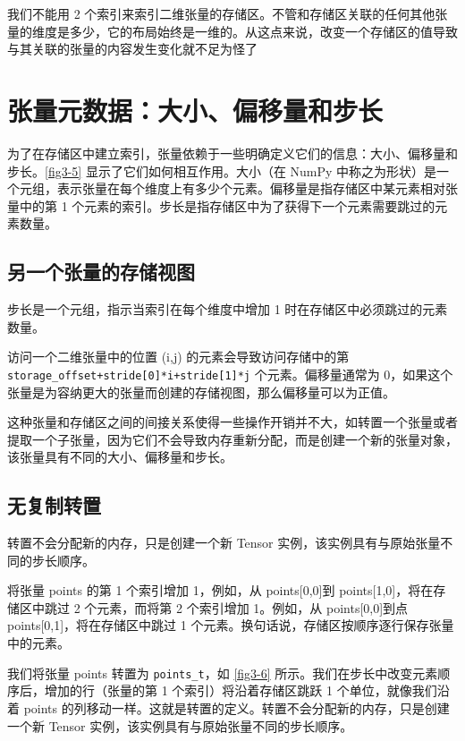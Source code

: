 我们不能用 2 个索引来索引二维张量的存储区。不管和存储区关联的任何其他张量的维度是多少，它的布局始终是一维的。从这点来说，改变一个存储区的值导致与其关联的张量的内容发生变化就不足为怪了

\section{张量元数据：大小、偏移量和步长}
为了在存储区中建立索引，张量依赖于一些明确定义它们的信息：大小、偏移量和步长。\autoref{fig3-5} 显示了它们如何相互作用。大小（在 NumPy 中称之为形状）是一个元组，表示张量在每个维度上有多少个元素。偏移量是指存储区中某元素相对张量中的第 1 个元素的索引。步长是指存储区中为了获得下一个元素需要跳过的元素数量。

\subsection{另一个张量的存储视图}
步长是一个元组，指示当索引在每个维度中增加 1 时在存储区中必须跳过的元素数量。

访问一个二维张量中的位置 (i,j) 的元素会导致访问存储中的第 \verb|storage_offset+stride[0]*i+stride[1]*j| 个元素。偏移量通常为 0，如果这个张量是为容纳更大的张量而创建的存储视图，那么偏移量可以为正值。

这种张量和存储区之间的间接关系使得一些操作开销并不大，如转置一个张量或者提取一个子张量，因为它们不会导致内存重新分配，而是创建一个新的张量对象，该张量具有不同的大小、偏移量和步长。
\subsection{无复制转置}
转置不会分配新的内存，只是创建一个新 Tensor 实例，该实例具有与原始张量不同的步长顺序。

将张量 points 的第 1 个索引增加 1，例如，从 points[0,0]到 points[1,0]，将在存储区中跳过 2 个元素，而将第 2 个索引增加 1。例如，从 points[0,0]到点 points[0,1]，将在存储区中跳过 1 个元素。换句话说，存储区按顺序逐行保存张量中的元素。

我们将张量 points 转置为 \verb|points_t|，如 \autoref{fig3-6} 所示。我们在步长中改变元素顺序后，增加的行（张量的第 1 个索引）将沿着存储区跳跃 1 个单位，就像我们沿着 points 的列移动一样。这就是转置的定义。转置不会分配新的内存，只是创建一个新 Tensor 实例，该实例具有与原始张量不同的步长顺序。

